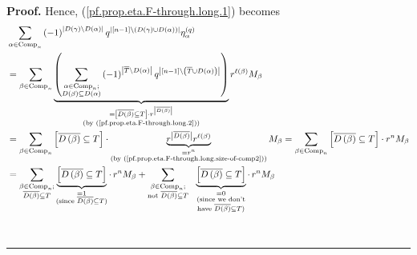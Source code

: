\documentclass[numbers=enddot,12pt,final,onecolumn,notitlepage]{scrartcl}%
\theoremstyle{definition}
\newenvironment{proof}[1][Proof]{\noindent\textbf{#1.} }{\ \rule{0.5em}{0.5em}}
\let\sumnonlimits\sum
\renewcommand{\sum}{\sumnonlimits\limits}
\newenvironment{verlong}{}{}
\begin{document}
\begin{verlong}
\begin{proof}
Hence, (\ref{pf.prop.eta.F-through.long.1}) becomes%
\begin{align}
&  \sum_{\alpha\in\operatorname*{Comp}\nolimits_{n}}\left(  -1\right)
^{\left\vert D\left(  \gamma\right)  \setminus D\left(  \alpha\right)
\right\vert }q^{\left\vert \left[  n-1\right]  \setminus\left(  D\left(
\gamma\right)  \cup D\left(  \alpha\right)  \right)  \right\vert }\eta
_{\alpha}^{\left(  q\right)  }\nonumber\\
&  =\sum_{\beta\in\operatorname*{Comp}\nolimits_{n}}\underbrace{\left(
\sum_{\substack{\alpha\in\operatorname*{Comp}\nolimits_{n};\\D\left(
\beta\right)  \subseteq D\left(  \alpha\right)  }}\left(  -1\right)
^{\left\vert \overline{T}\setminus D\left(  \alpha\right)  \right\vert
}q^{\left\vert \left[  n-1\right]  \setminus\left(  \overline{T}\cup D\left(
\alpha\right)  \right)  \right\vert }\right)  }_{\substack{=\left[
\overline{D\left(  \beta\right)  }\subseteq T\right]  \cdot r^{\left\vert
\overline{D\left(  \beta\right)  }\right\vert }\\\text{(by
(\ref{pf.prop.eta.F-through.long.2}))}}}r^{\ell\left(  \beta\right)  }%
M_{\beta}\nonumber\\
&  =\sum_{\beta\in\operatorname*{Comp}\nolimits_{n}}\left[  \overline{D\left(
\beta\right)  }\subseteq T\right]  \cdot\underbrace{r^{\left\vert
\overline{D\left(  \beta\right)  }\right\vert }r^{\ell\left(  \beta\right)  }%
}_{\substack{=r^{n}\\\text{(by (\ref{pf.prop.eta.F-through.long.size-of-comp2}%
))}}}M_{\beta}=\sum_{\beta\in\operatorname*{Comp}\nolimits_{n}}\left[
\overline{D\left(  \beta\right)  }\subseteq T\right]  \cdot r^{n}M_{\beta
}\nonumber\\
&  =\sum_{\substack{\beta\in\operatorname*{Comp}\nolimits_{n};\\\overline
{D\left(  \beta\right)  }\subseteq T}}\underbrace{\left[  \overline{D\left(
\beta\right)  }\subseteq T\right]  }_{\substack{=1\\\text{(since }%
\overline{D\left(  \beta\right)  }\subseteq T\text{)}}}\cdot\,r^{n}M_{\beta
}+\sum_{\substack{\beta\in\operatorname*{Comp}\nolimits_{n};\\\text{not
}\overline{D\left(  \beta\right)  }\subseteq T}}\ \ \underbrace{\left[
\overline{D\left(  \beta\right)  }\subseteq T\right]  }%
_{\substack{=0\\\text{(since we don't}\\\text{have }\overline{D\left(
\beta\right)  }\subseteq T\text{)}}}\cdot\,r^{n}M_{\beta}\nonumber\\

\end{align}
\end{proof}
\end{verlong}
\end{document}
